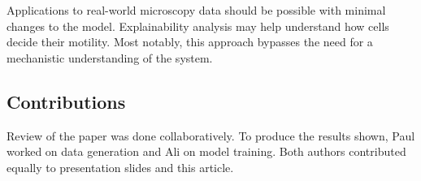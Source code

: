 \documentclass[a4paper,10pt,twocolumn]{article}
\begin{document}
        Applications to real-world microscopy data should be possible with minimal changes to the model.
        Explainability analysis may help understand how cells decide their motility.
        Most notably, this approach bypasses the need for a mechanistic understanding of the system.

        \subsection*{Contributions}
            Review of the paper was done collaboratively. 
            To produce the results shown, Paul worked on data generation and Ali on model training.
            Both authors contributed equally to presentation slides and this article.

    
    
    
\end{document}
